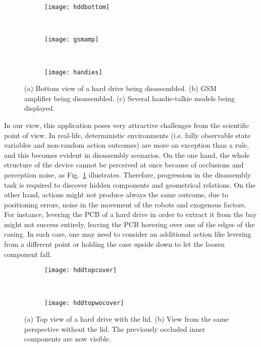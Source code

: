\documentclass[../root.tex]{subfiles}
\begin{document}
\begin{figure}[tbhp]
	\centering
	\begin{subfigure}[b]{0.31\columnwidth}
		\texttt{[image: hddbottom]}
		\caption{}
	\end{subfigure}
	~
	\begin{subfigure}[b]{0.31\columnwidth}
		\texttt{[image: gsmamp]}
		\caption{}
	\end{subfigure}
	~
	\begin{subfigure}[b]{0.31\columnwidth}
		\texttt{[image: handies]}
		\caption{}
	\end{subfigure}
	\caption{
		(a) Bottom view of a hard drive being disassembled.
		(b) GSM amplifier being disassembled.
		(c) Several handie-talkie models being displayed.
	}
	\label{fig:examples-of-devices}
\end{figure}

In our view, this application poses very attractive challenges
from the scientific point of view. In real-life, deterministic environments
(i.e. fully observable state variables and non-random action outcomes)
are more an exception than a rule, and this becomes evident in disassembly
scenarios. On the one hand, the whole structure of the device cannot be
perceived at once because of occlusions and perception noise, as
Fig.~\ref{fig:examples-of-devices} illustrates. Therefore, progression
in the disassembly task is required to discover hidden components and
geometrical relations. On the other hand, actions might not produce
always the same outcome, due to positioning errors, noise in the movement
of the robots and exogenous factors. For instance, levering the PCB
of a hard drive in order to extract it from the bay might not success
entirely, leaving the PCB hovering over one of the edges of the casing.
In such case, one may need to consider an additional action like levering
from a different point or holding the case upside down to let the loosen
component fall.

\begin{figure}[tbhp]
	\centering
	\begin{subfigure}[b]{0.45\columnwidth}
		\texttt{[image: hddtopcover]}
		\caption{}
	\end{subfigure}
	~
	\begin{subfigure}[b]{0.45\columnwidth}
		\texttt{[image: hddtopwocover]}
		\caption{}
	\end{subfigure}
	\caption{
		(a) Top view of a hard drive with the lid.
		(b) View from the same perspective without the lid. The
		previously occluded inner components are now visible.
	}
	\label{fig:example-of-occlusion}
\end{figure}
\end{document}
